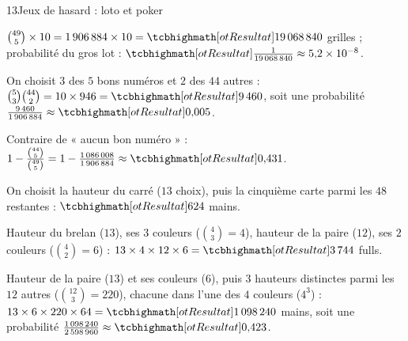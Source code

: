 \begin{corrige}{13}{Jeux de hasard : loto et poker}
\begin{questions}
  \item $\binom{49}{5}\times10=1\,906\,884\times10=\res{19\,068\,840}$ grilles ; probabilité du gros lot : $\res{\frac{1}{19\,068\,840}\approx5{,}2\times10^{-8}}$.
  \item On choisit $3$ des $5$ bons numéros et $2$ des $44$ autres : $\binom53\binom{44}2=10\times946=\res{9\,460}$, soit une
    probabilité $\frac{9\,460}{1\,906\,884}\approx\res{0{,}005}$.
  \item Contraire de « aucun bon numéro » : $1-\frac{\binom{44}{5}}{\binom{49}{5}}=1-\frac{1\,086\,008}{1\,906\,884}\approx\res{0{,}431}$.
\end{questions}
\begin{questions}[resume]
  \item On choisit la hauteur du carré ($13$ choix), puis la cinquième carte parmi les $48$ restantes : $\res{624}$ mains.
  \item Hauteur du brelan ($13$), ses $3$ couleurs ($\binom43=4$), hauteur de la paire ($12$), ses $2$ couleurs ($\binom42=6$) :
    $13\times4\times12\times6=\res{3\,744}$ fulls.
  \item Hauteur de la paire ($13$) et ses couleurs ($6$), puis $3$ hauteurs distinctes parmi les $12$ autres ($\binom{12}3=220$),
    chacune dans l'une des $4$ couleurs ($4^{3}$) : $13\times6\times220\times64=\res{1\,098\,240}$ mains, soit une probabilité
    $\frac{1\,098\,240}{2\,598\,960}\approx\res{0{,}423}$.
\end{questions}
\end{corrige}
